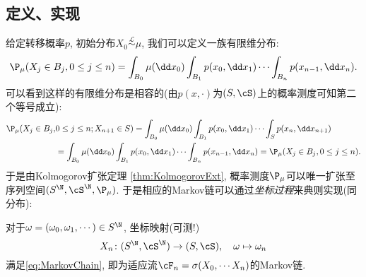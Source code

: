 \documentclass[a4paper, 10pt]{ctexart}
\begin{document}
\subsection{定义、实现}
给定转移概率$p$, 初始分布$X_0 \stackrel{\mathcal L}{\sim} \mu$, 我们可以定义一族有限维分布: 
\begin{equation*}
	\P_{\mu}(X_j \in B_j, 0 \leq j \leq n)
	= \int_{B_0} \mu(\dd x_0) \int_{B_1} p(x_0, \dd x_1) \cdots \int_{B_n} p(x_{n-1}, \dd x_n). 
\end{equation*}
可以看到这样的有限维分布是相容的(由$p(x, \cdot )$为$(S,\cS)$上的概率测度可知第二个等号成立): 
\begin{align*}
	\P_{\mu}(X_j \in B_j,& 0 \leq j \leq n; X_{n+1} \in S)
	= \int_{B_0} \mu(\dd x_0) \int_{B_1} p(x_0, \dd x_1) \cdots \int_{S} p(x_{n}, \dd x_{n+1}) \\
	&= \int_{B_0} \mu(\dd x_0) \int_{B_1} p(x_0, \dd x_1) \cdots \int_{B_n} p(x_{n-1}, \dd x_n) 
	= \P_{\mu}(X_j \in B_j, 0 \leq j \leq n). 
\end{align*}
于是由Kolmogorov扩张定理 \ref{thm:KolmogorovExt}, 概率测度$\P_{\mu}$可以唯一扩张至序列空间$(S^{\N}, \cS^{\N}, \P_{\mu})$. 
于是相应的Markov链可以通过\emph{坐标过程}来典则实现(同分布): 

\begin{theorem}[典则实现]
	对于$\omega = (\omega_0, \omega_1, \cdots) \in S^{\N}$, 坐标映射(可测!)
	\begin{equation*}
		X_n \colon (S^{\N}, \cS^{\N}) \to (S, \cS), \quad  \omega \mapsto \omega_n
	\end{equation*}
	满足\eqref{eq:MarkovChain}, 即为适应流$\cF_n = \sigma(X_0, \cdots X_n)$的Markov链. 
\end{theorem}
\end{document}
